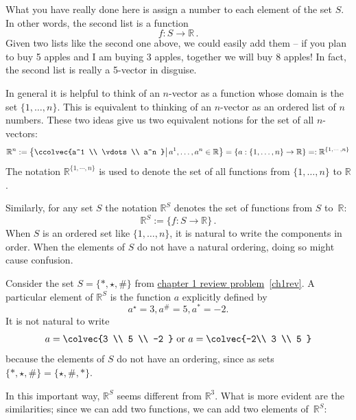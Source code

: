 \noindent
What you have really done here is assign a number to each element of the set $S$. In other words, the second list is a function
\[
f:S\longrightarrow {\mathbb R}\, .
\]
Given two lists like the second one above, we could easily add them -- if you plan to buy 5 apples and I am buying 3 apples, together we
will buy 8 apples! In fact, the second list is really a 5-vector in disguise. 

In general
it is helpful to think of an $n$-vector as a function whose domain is the set 
$\{1,\dots,n\}$.
This is equivalent to thinking of an $n$-vector as an ordered list of $n$ numbers.
These two ideas give us  two equivalent notions for the set of all $n$-vectors:
\[
{\mathbb{R}}^n :=\left\{ \ccolvec{a^1 \\ \vdots \\ a^n } \middle\vert \,  a^1,\dots ,a^n \in \mathbb{R} \right\}
=\{ a:\{1,\dots,n\}\to \mathbb{R}\} =: \mathbb{R}^{ \{1,\cdots,n\} }
\]
The notation $\mathbb{R}^{ \{1,\cdots,n\} }$ is used to denote the set of all functions from $   \{1,\dots,n\} $ to $\mathbb{R}$. 

Similarly, for any set $S$ the notation $\mathbb{R}^S$ denotes the set of functions from $S$ to~$\mathbb{R}$:
\[
{\mathbb R}^S:=\{ f:S\to {\mathbb R}\}\, .
\]
When $S$ is an ordered set like $\{1,\dots,n\}$, it is natural to write the components in order. When the elements of $S$ do not have a natural ordering, doing so might cause confusion. 



\begin{example}
{Consider the set } $S=\{*, \star, \# \}$ from \hyperlink{Consider the set}{chapter 1 review problem}~\ref{ch1rev}. A particular element of $\mathbb{R}^S$ is the function $a$ explicitly defined by 
\[ a^{\star}=3, a^{\#}=5, a^{*}=-2.\]
It is not natural to write 
\[
a=\colvec{3 \\ 5 \\ -2 } ~{\rm or} ~a=\colvec{-2\\ 3 \\ 5 } 
\]
because the elements of $S$ do not have an ordering, since as sets $\{*, \star, \# \}=\{\star, \#,*\}$.
\end{example}


In this important way, $\mathbb{R}^S$ seems different from $\mathbb{R}^3$. 
What is more evident are the similarities; since we can add two functions, we can add two elements of~$\mathbb{R}^S$:


